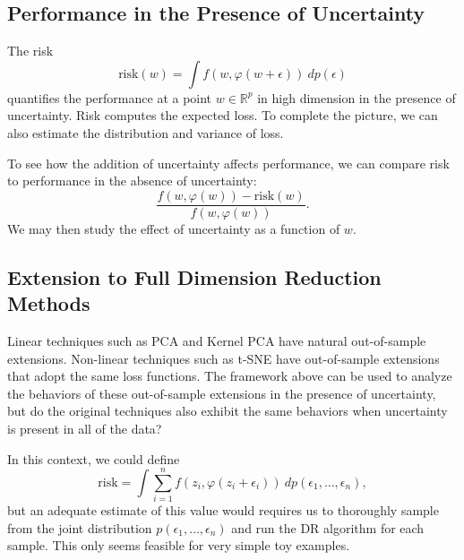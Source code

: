 \documentclass{article}
\begin{document}
\subsection{Performance in the Presence of Uncertainty}
The risk $$\textrm{risk}(w) = \int f(w, \varphi(w + \epsilon)) \:dp(\epsilon)$$ quantifies the performance at a point $w \in \mathbb{R}^p$ in high dimension in the presence of uncertainty. Risk computes the expected loss. To complete the picture, we can also estimate the distribution and variance of loss.

\bigbreak To see how the addition of uncertainty affects performance, we can compare risk to performance in the absence of uncertainty: $$\frac{f(w, \varphi(w)) - \textrm{risk}(w)}{f(w, \varphi(w))}.$$ We may then study the effect of uncertainty as a function of $w$.

\subsection{Extension to Full Dimension Reduction Methods}
Linear techniques such as PCA and Kernel PCA have natural out-of-sample extensions. Non-linear techniques such as t-SNE have out-of-sample extensions that adopt the same loss functions. The framework above can be used to analyze the behaviors of these out-of-sample extensions in the presence of uncertainty, but do the original techniques also exhibit the same behaviors when uncertainty is present in all of the data?

\bigbreak In this context, we could define $$\textrm{risk} = \int \sum_{i=1}^n f(z_i, \varphi(z_i + \epsilon_i)) \:dp(\epsilon_1, \hdots, \epsilon_n),$$ but an adequate estimate of this value would requires us to thoroughly sample from the joint distribution $p(\epsilon_1, \hdots, \epsilon_n)$ and run the DR algorithm for each sample. This only seems feasible for very simple toy examples.
\end{document}
